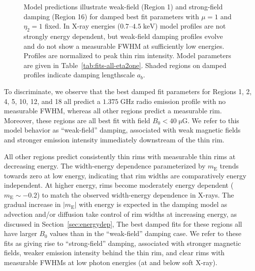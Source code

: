 \documentclass[iop, apj, numberedappendix]{emulateapj}
\newcommand*{\mt}{\mathrm}
\newcommand*{\unit}[1]{\;\mt{#1}}  %
\newcommand*{\mE}{m_\mt{E}}
\newcommand*{\muG}{\unit{\mu G}}
\begin{document}
\begin{figure}
    \centering
    \iftoggle{manuscript}{
        \epsscale{0.7}
        \plotone{figures/prfs-fit-damp-01.pdf} \\
        \plotone{figures/prfs-fit-damp-16.pdf}
        \epsscale{1}
    }{
        \plotone{figures/prfs-fit-damp-01.pdf} \\
        \plotone{figures/prfs-fit-damp-16.pdf}
    }
    \caption{Model predictions illustrate weak-field (Region 1) and
        strong-field damping (Region 16) for damped best fit parameters with
        $\mu=1$ and $\eta_2=1$ fixed.  In X-ray energies ($0.7$--$4.5
        \unit{keV}$) model profiles are not strongly energy dependent, but
        weak-field damping profiles evolve and do not show a measurable FWHM at
        sufficiently low energies.
        Profiles are normalized to peak thin rim intensity.  Model parameters
        are given in Table~\ref{tab:fits-all-eta2one}.  Shaded regions on damped
        profiles indicate damping lengthscale $a_b$.
        \label{fig:rims}}
\end{figure}


To discriminate, we observe that the best damped fit parameters for Regions
1, 2, 4, 5, 10, 12, and 18 all predict a $1.375 \unit{GHz}$ radio emission
profile with no measurable FWHM, whereas all other regions predict a measurable
rim.  Moreover, these regions are all best fit with field $B_0 < 40 \muG$.
We refer to this model behavior as
``weak-field'' damping, associated with weak magnetic fields and stronger
emission intensity immediately downstream of the thin rim.

All other regions predict consistently thin rims with measurable thin rims at
decreasing energy.  The width-energy dependence parameterized by $\mE$ trends
towards zero at low energy, indicating that rim widths are comparatively energy
independent.
At higher energy, rims become moderately energy dependent ($\mE \sim -0.2$) to
match the observed width-energy dependence in X-rays.  The gradual increase in
$|\mE|$ with energy is expected in the damping model as advection and/or
diffusion take
control of rim widths at increasing energy, as discussed in
Section~\ref{sec:energydep},  The best damped fits for these regions all have
larger $B_0$ values than in the ``weak-field'' damping case.  We refer to these
fits as giving rise to ``strong-field'' damping, associated with stronger
magnetic fields, weaker emission intensity behind the thin rim, and clear rims
with measurable FWHMs at low photon energies (at and below soft X-ray).
\end{document}
